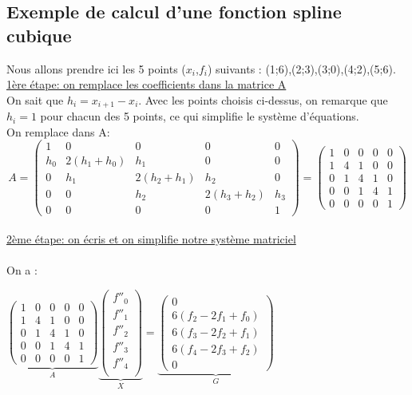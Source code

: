 \documentclass{article}
\begin{document}
\subsection {Exemple de calcul d'une fonction spline cubique}
\begingroup\raggedleft
Nous allons prendre ici les 5 points ($x_i$,$f_i$) suivants : (1;6),(2;3),(3;0),(4;2),(5;6).
\endgroup
\\[10pt]
\underline{1\`{e}re \'{e}tape: on remplace les coefficients dans la matrice A}
\\[10pt]
On sait que $h_i=x_{i+1}-x_i$. Avec les points choisis ci-dessus, on remarque que $h_i=1$ pour chacun des 5 points, ce qui simplifie le syst\`eme d'\'{e}quations.\\
On remplace dans A:
\[A=\begin{pmatrix}
   1 & 0 & 0 & 0 & 0 \\
   h_0 & 2(h_1+h_0) & h_1 & 0 & 0 \\
   0 & h_1 & 2(h_2+h_1) & h_2 & 0 \\
   0 & 0 & h_2 & 2(h_3+h_2) & h_3 \\
   0 & 0 & 0 & 0 & 1
 \end{pmatrix}
 =
\begin{pmatrix}
   1 & 0 & 0 & 0 & 0 \\
   1 & 4 & 1 & 0 & 0 \\
   0 & 1 & 4 & 1 & 0 \\
   0 & 0 & 1 & 4 & 1 \\
   0 & 0 & 0 & 0 & 1
\end{pmatrix}\]
\\
\underline{2\`eme \'{e}tape: on \'{e}cris et on simplifie notre syst\`{e}me matriciel}\\\\
On a :
\begin{center}
$
\underbrace{
  \begin{pmatrix}
  1 & 0 & 0 & 0 & 0 \\
  1 & 4 & 1 & 0 & 0 \\
  0 & 1 & 4 & 1 & 0 \\
  0 & 0 & 1 & 4 & 1 \\
  0 & 0 & 0 & 0 & 1
 \end{pmatrix}
}_{A}
\underbrace{
\begin{pmatrix}
   f''_0 \\
   f''_1 \\
f''_2 \\
   f''_3 \\
f''_4 \\
 \end{pmatrix}
}_{X}
=
\underbrace{
\begin{pmatrix}
  0\\ 
6(f_{2}-2f_1+f_{0})\\
6(f_{3}-2f_2+f_{1})\\
6(f_{4}-2f_3+f_{2})\\
0
 \end{pmatrix}
}_{G}
$
\end{center}
\end{document}
